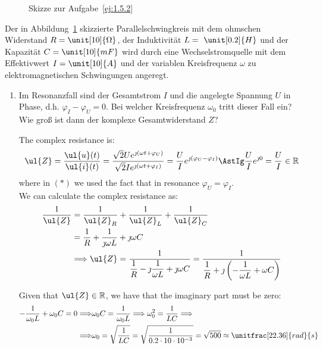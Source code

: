 \begin{ejercicio}
\begin{figure}
\begin{tikzpicture}
        \end{tikzpicture}
        \caption{Skizze zur Aufgabe~\ref{ej:1.5.2}}
        \label{fig:parallelschwingkreis}
    \end{figure}
    Der in Abbildung~\ref{fig:parallelschwingkreis} skizzierte Parallelschwingkreis mit dem ohmschen Widerstand $R = \unit[10]{\Omega}$, der Induktivität $L =~\unit[0.2]{H}$ und der Kapazität $C = \unit[10]{mF}$ wird durch eine Wechselstromquelle mit dem Effektivwert $I = \unit[10]{A}$ und der variablen Kreisfrequenz $\omega$ zu elektromagnetischen Schwingungen angeregt.
    \begin{enumerate}
        \item Im Resonanzfall sind der Gesamtstrom $I$ und die angelegte Spannung $U$ in Phase, d.h. $\varphi_I - \varphi_U = 0$. Bei welcher Kreisfrequenz $\omega_0$ tritt dieser Fall ein? Wie groß ist dann der komplexe Gesamtwiderstand $Z$?
        
        The complex resistance is:
        \begin{align*}
            \ul{Z} = \dfrac{\ul{u}(t)}{\ul{i}(t)}
            = \dfrac{\sqrt{2}U e^{\jmath(\omega t + \varphi_U)}}{\sqrt{2}I e^{\jmath(\omega t + \varphi_I)}}
            = \dfrac{U}{I} e^{\jmath(\varphi_U - \varphi_I)}
            \AstIg \dfrac{U}{I} e^{\jmath 0}
            = \dfrac{U}{I} \in \mathbb{R}
        \end{align*}
        where in $(\ast)$ we used the fact that in resonance $\varphi_U = \varphi_I$.\\

        We can calculate the complex resistance as:
        \begin{align*}
            \dfrac{1}{\ul{Z}} &= \dfrac{1}{\ul{Z}_R} + \dfrac{1}{\ul{Z}_L} + \dfrac{1}{\ul{Z}_C} \\
            &= \dfrac{1}{R} + \dfrac{1}{\jmath \omega L} + \jmath \omega C \\
            &\Longrightarrow
            \ul{Z} = \dfrac{1}{\dfrac{1}{R} - \jmath \dfrac{1}{\omega L} + \jmath \omega C}
            = \dfrac{1}{\dfrac{1}{R} + \jmath \left(-\dfrac{1}{\omega L} + \omega C\right)}
        \end{align*}

        Given that $\ul{Z}\in \mathbb{R}$, we have that the imaginary part must be zero:
        \begin{align*}
            -\dfrac{1}{\omega_0 L} + \omega_0 C = 0
            \Longrightarrow& \omega_0C = \dfrac{1}{\omega_0 L}
            \Longrightarrow \omega_0^2 = \dfrac{1}{LC}
            \Longrightarrow\\\Longrightarrow & \omega_0 = \sqrt{\dfrac{1}{LC}}
            = \sqrt{\dfrac{1}{0.2 \cdot 10 \cdot 10^{-3}}}
            = \sqrt{500} \approx \unitfrac[22.36]{rad}{s}
        \end{align*}


\end{enumerate}
\end{ejercicio}
